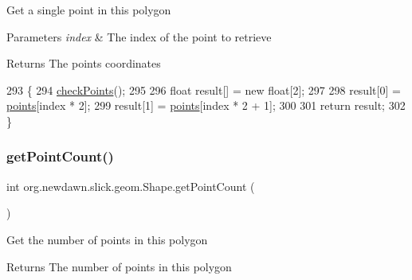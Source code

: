 Get a single point in this polygon


\begin{DoxyParams}{Parameters}
{\em index} & The index of the point to retrieve \\
\hline
\end{DoxyParams}
\begin{DoxyReturn}{Returns}
The point\textquotesingle{}s coordinates 
\end{DoxyReturn}

\begin{DoxyCode}
293                                        \{
294         \mbox{\hyperlink{classorg_1_1newdawn_1_1slick_1_1geom_1_1_shape_a84293802d05e8666a441720bfc12745d}{checkPoints}}();
295 
296         \textcolor{keywordtype}{float} result[] = \textcolor{keyword}{new} \textcolor{keywordtype}{float}[2];
297         
298         result[0] = \mbox{\hyperlink{classorg_1_1newdawn_1_1slick_1_1geom_1_1_shape_a8b4d4058734bbb3b96072e470b92aa37}{points}}[index * 2];
299         result[1] = \mbox{\hyperlink{classorg_1_1newdawn_1_1slick_1_1geom_1_1_shape_a8b4d4058734bbb3b96072e470b92aa37}{points}}[index * 2 + 1];
300         
301         \textcolor{keywordflow}{return} result;
302     \}
\end{DoxyCode}
\mbox{\label{classorg_1_1newdawn_1_1slick_1_1geom_1_1_shape_a2198e0c426b9694ee0bfdb82bce8ee99}} 
\subsubsection{\texorpdfstring{get\+Point\+Count()}{getPointCount()}}
{\footnotesize\ttfamily int org.\+newdawn.\+slick.\+geom.\+Shape.\+get\+Point\+Count (\begin{DoxyParamCaption}{ }\end{DoxyParamCaption})\hspace{0.3cm}{\ttfamily [inline]}}

Get the number of points in this polygon

\begin{DoxyReturn}{Returns}
The number of points in this polygon 
\end{DoxyReturn}

